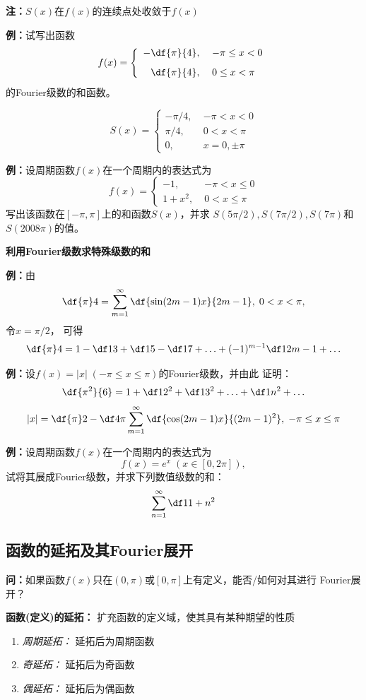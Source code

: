 {\bf 注：}$S(x)$在$f(x)$的连续点处收敛于$f(x)$

{\bf 例：}试写出函数
$$f(x)=\left\{\begin{array}{rl}
	-\df{\pi}{4},\; & -\pi\leq x<0\\[8pt]
	\df{\pi}{4},\; & 0\leq x<\pi
\end{array}\right.$$
的Fourier级数的和函数。

$${S(x)=\left\{\begin{array}{ll}
	-\pi/4,\;& -\pi<x<0\\
	\pi/4,\;& 0<x<\pi\\
	0,\; & x=0,\pm\pi
\end{array}\right.}$$

{\bf 例：}设周期函数$f(x)$在一个周期内的表达式为
$$f(x)=\left\{\begin{array}{ll}
	-1,\;& -\pi<x\leq 0\\
	1+x^2,\; & 0<x\leq\pi
\end{array}\right.$$
写出该函数在$[-\pi,\pi]$上的和函数$S(x)$，并求
$S(5\pi/2),S(7\pi/2),S(7\pi)$和$S(2008\pi)$的值。

{\bf 利用Fourier级数求特殊级数的和}

{\bf 例：}由
$$\df{\pi}4=\sum\limits_{m=1}^{\infty}
\df{\sin(2m-1)x}{2m-1},\;0<x<\pi,$$
 令$x=\pi/2$， 可得
$$\df{\pi}4=1-\df 13+\df 15-\df 17+\ldots
+(-1)^{m-1}\df 1{2m-1}+\ldots$$

{\bf 例：}设$f(x)=|x|\;(-\pi\leq x\leq \pi)$的Fourier级数，并由此
证明：
$$\df{\pi^2}{6}=1+\df 1{2^2}+\df 1{3^2}+\ldots+\df 1{n^2}+\ldots$$
$${|x|=\df{\pi}2-\df 4{\pi}\sum\limits_{m=1}^{\infty} 
\df{\cos(2m-1)x}{(2m-1)^2},\;-\pi\leq x\leq \pi}$$

{\bf 例：}设周期函数$f(x)$在一个周期内的表达式为
$$f(x)=e^x\;(x\in[0,2\pi]),$$
试将其展成Fourier级数，并求下列数值级数的和：
$$\sum\limits_{n=1}^{\infty}\df1{1+n^2}$$

\subsection{函数的延拓及其Fourier展开}

{\bf 问：}如果函数$f(x)$只在$(0,\pi)$或$[0,\pi]$上有定义，能否/如何对其进行
Fourier展开？

{\bf 函数(定义)的延拓：} 扩充函数的定义域，使其具有某种期望的性质 
\begin{enumerate}[(1)]
  \setlength{\itemindent}{1cm}
  \item {\it 周期延拓：} 延拓后为周期函数 
  \item {\it 奇延拓：} 延拓后为奇函数 
  \item {\it 偶延拓：} 延拓后为偶函数
\end{enumerate}	

